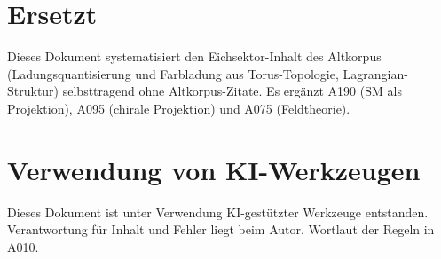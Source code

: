 \section{Ersetzt}

Dieses Dokument systematisiert den Eichsektor-Inhalt des Altkorpus
(Ladungsquantisierung und Farbladung aus Torus-Topologie, Lagrangian-Struktur)
selbsttragend ohne Altkorpus-Zitate. Es ergänzt A190 (SM als Projektion),
A095 (chirale Projektion) und A075 (Feldtheorie).

\section{Verwendung von KI-Werkzeugen}

Dieses Dokument ist unter Verwendung KI-gestützter Werkzeuge entstanden.
Verantwortung für Inhalt und Fehler liegt beim Autor. Wortlaut der Regeln in A010.
